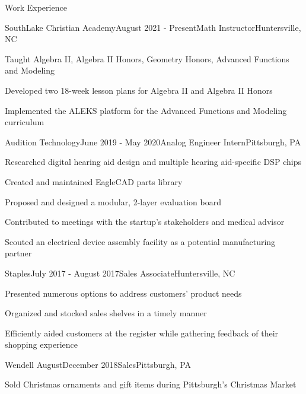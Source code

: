 \documentclass{resume} %
\begin{document}
\begin{Section}{Work Experience}

\begin{Subsection}{SouthLake Christian Academy}{August 2021 - Present}{Math Instructor}{Huntersville, NC}
\item Taught Algebra II, Algebra II Honors, Geometry Honors, Advanced Functions and Modeling
\item Developed two 18-week lesson plans for Algebra II and Algebra II Honors
\item Implemented the ALEKS platform for the Advanced Functions and Modeling curriculum
\end{Subsection}

\begin{Subsection}{Audition Technology}{June 2019 - May 2020}{Analog Engineer Intern}{Pittsburgh, PA}
\item Researched digital hearing aid design and multiple hearing aid-specific DSP chips
\item Created and maintained EagleCAD parts library
\item Proposed and designed a modular, 2-layer evaluation board
\item Contributed to meetings with the startup's stakeholders and medical advisor
\item Scouted an electrical device assembly facility as a potential manufacturing partner
\end{Subsection}

\begin{Subsection}{Staples}{July 2017 - August 2017}{Sales Associate}{Huntersville, NC}
\item Presented numerous options to address customers’ product needs
\item Organized and stocked sales shelves in a timely manner
\item Efficiently aided customers at the register while gathering feedback of their shopping experience
\end{Subsection}

\begin{Subsection}{Wendell August}{December 2018}{Sales}{Pittsburgh, PA}
\item Sold Christmas ornaments and gift items during Pittsburgh’s Christmas Market
\end{Subsection}

\end{Section}
\end{document}

